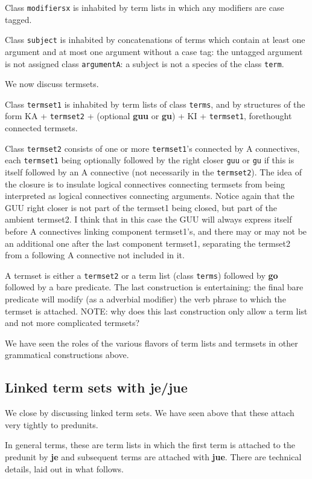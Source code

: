 \documentclass[12pt]{book}
\begin{document}
Class {\tt modifiersx} is inhabited by term lists in which any modifiers are case tagged.

Class {\tt subject} is inhabited by concatenations of terms which contain at least one argument and at most one argument without a case tag:
the untagged argument is not assigned class {\tt argumentA}:  a subject is not a species of the class {\tt term}.  

We now discuss termsets.

Class {\tt termset1} is inhabited by term lists of class {\tt terms}, and by structures of the form KA + {\tt termset2} + (optional {\bf guu} or {\bf gu}) + KI + {\tt termset1}, forethought connected termsets.

Class {\tt termset2} consists of one or more {\tt termset1}'s connected by A connectives, each {\tt termset1} being optionally followed by
the right closer {\tt guu} or {\tt gu} if this is itself followed by an A connective (not necessarily in the {\tt termset2}).  The idea of the closure is to insulate logical connectives connecting termsets
from being interpreted as logical connectives connecting arguments.  Notice again that the GUU right closer is not part of the termset1 being closed,
but part of the ambient termset2.  I think that in this case the GUU will always express itself before A connectives linking component termset1's, and there may or may not be an additional one after the last component termset1, separating the termset2 from a following A connective not included in it.

A termset is either a {\tt termset2} or a term list (class {\tt terms}) followed by {\bf go} followed by a bare predicate.  The last construction is entertaining:  the final bare predicate will modify (as a adverbial modifier)  the verb phrase to which the termset is attached.  NOTE:  why does this last construction only allow a term list and not more complicated termsets?

We have seen the roles of the various flavors of term lists and termsets in other grammatical constructions above.


\subsection{Linked term sets with {\bf je/jue}}

We close by discussing linked term sets.  We have seen above that these attach very tightly to predunits.

In general terms, these are term lists in which the first term is attached to the predunit by {\bf je} and subsequent terms are attached
with {\bf jue}.  There are technical details, laid out in what follows.
\end{document}
